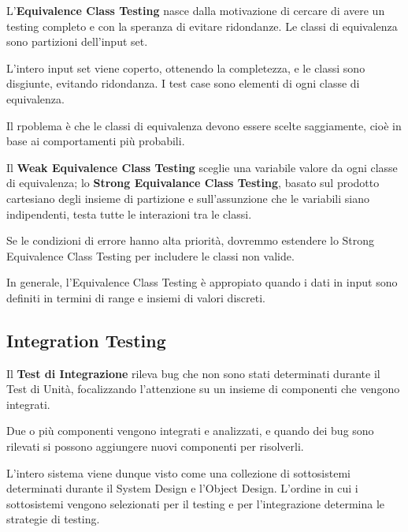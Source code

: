 \documentclass{article}
\begin{document}
            L'\textbf{Equivalence Class Testing} nasce dalla motivazione di cercare di avere un testing completo e con la speranza di evitare ridondanze. Le classi di equivalenza sono partizioni dell'input set. 
            
            L'intero input set viene coperto, ottenendo la completezza, e le classi sono disgiunte, evitando ridondanza. I test case sono elementi di ogni classe di equivalenza. 
            
            Il rpoblema è che le classi di equivalenza devono essere scelte saggiamente, cioè in base ai comportamenti più probabili.
        
            \vspace{3mm}
            
            Il \textbf{Weak Equivalence Class Testing} sceglie una variabile valore da ogni classe di equivalenza; lo \textbf{Strong Equivalance Class Testing}, basato sul prodotto cartesiano degli insieme di partizione e sull'assunzione che le variabili siano indipendenti, testa tutte le interazioni tra le classi. 
            
            Se le condizioni di errore hanno alta priorità, dovremmo estendere lo Strong Equivalence Class Testing per includere le classi non valide.
            
            \vspace{3mm}
            
            In generale, l'Equivalence Class Testing è appropiato quando i dati in input sono definiti in termini di range e insiemi di valori discreti.
            
    \subsection{Integration Testing}
        
        Il \textbf{Test di Integrazione} rileva bug che non sono stati determinati durante il Test di Unità, focalizzando l'attenzione su un insieme di componenti che vengono integrati. 
        
        Due o più componenti vengono integrati e analizzati, e quando dei bug sono rilevati si possono aggiungere nuovi componenti per risolverli. 
        
        L'intero sistema viene dunque visto come una collezione di sottosistemi determinati durante il System Design e l'Object Design. 
        L'ordine in cui i sottosistemi vengono selezionati per il testing e per l'integrazione determina le strategie di testing.
        
\end{document}
